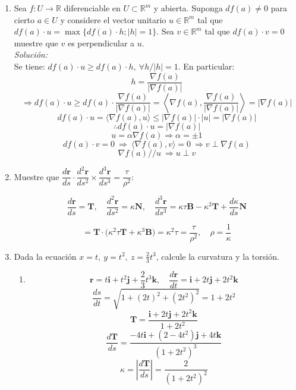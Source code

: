 \documentclass[12pt]{article}
\begin{document}
\begin{enumerate}

    \item Sea $f:U\to\mathbb{R}$ diferenciable en $U\subset\mathbb{R}^m$ y abierta. Suponga $df(a)\neq0$ para cierto $a\in U$ y considere el vector unitario $u\in\mathbb{R}^m$ tal que $df(a)\cdot u=\max\{df(a)\cdot h;|h|=1\}$. Sea $v\in\mathbb{R}^m$ tal que $df(a)\cdot v=0$ muestre que $v$ es perpendicular a $u$.\\

    \emph{Solución:}\\
    Se tiene: $df(a)\cdot u\geq df(a)\cdot h,\ \forall h/|h|=1$. En particular:
    \[
      h=\dfrac{\nabla f(a)}{|\nabla f(a)|}
    \]
    \[
      \Rightarrow df(a)\cdot u \geq df(a)\cdot \frac{\nabla f(a)}{|\nabla f(a)|}
      =\left\langle\nabla f(a), \frac{\nabla f(a)}{|\nabla f(a)|}\right\rangle
      =|\nabla f(a)|
    \]
    \[
      df(a)\cdot u=\langle\nabla f(a), u\rangle \leq|\nabla f(a)|\cdot|u|
      =|\nabla f(a)|
    \]
    \[
      \therefore df(a)\cdot u=|\nabla f(a)|
    \]
    \[
      u=\alpha \nabla f(a)\Rightarrow \alpha=\pm1
    \]
    \[
      df(a)\cdot v=0 \ \Rightarrow\ \langle\nabla f(a), v\rangle=0 \ \Rightarrow v \perp \nabla f(a)
    \]
    \[
      \nabla f(a)//u \ \Rightarrow u\perp v
    \]

    \item Muestre que $\dfrac{d \mathbf{r}}{d s} \cdot \dfrac{d^{2} \mathbf{r}}{d s^{2}} \times \dfrac{d^{3} \mathbf{r}}{d s^{3}}=\dfrac{\tau}{\rho^{2}}$:  

    \[
    \frac{d \mathbf{r}}{d s}=\mathbf{T}, \quad 
    \frac{d^{2} \mathbf{r}}{d s^{2}}=\kappa \mathbf{N}, \quad 
    \frac{d^{3} \mathbf{r}}{d s^{3}}=\kappa \tau \mathbf{B}-\kappa^{2} \mathbf{T}+\frac{d \kappa}{d s} \mathbf{N}
    \]

    \[
    =\mathbf{T}\cdot\big(\kappa^{2}\tau \mathbf{T}+\kappa^{3}\mathbf{B}\big)
    =\kappa^{2}\tau=\frac{\tau}{\rho^{2}}, \quad \rho=\frac{1}{\kappa}
    \]

    \item Dada la ecuación $x=t, \ y=t^2, \ z=\tfrac{2}{3}t^3$, calcule la curvatura y la torsión.

    \begin{enumerate}[label=(\alph*)]
        \item 
        \[
          \mathbf{r}=t\mathbf{i}+t^2\mathbf{j}+\frac{2}{3}t^3\mathbf{k}, \quad 
          \frac{d \mathbf{r}}{dt}=\mathbf{i}+2t\mathbf{j}+2t^2\mathbf{k}
        \]
        \[
          \frac{ds}{dt}=\sqrt{1+(2t)^2+(2t^2)^2}=1+2t^2
        \]
        \[
          \mathbf{T}=\frac{\mathbf{i}+2t\mathbf{j}+2t^2\mathbf{k}}{1+2t^2}
        \]
        \[
          \frac{d\mathbf{T}}{ds}=\frac{-4t\mathbf{i}+(2-4t^2)\mathbf{j}+4t\mathbf{k}}{(1+2t^2)^3}
        \]
        \[
          \kappa=\left|\frac{d\mathbf{T}}{ds}\right|=\frac{2}{(1+2t^2)^2}
        \]


\end{enumerate}
\end{enumerate}
\end{document}
